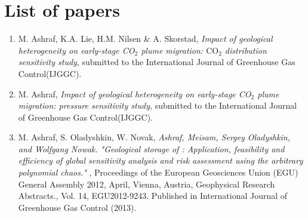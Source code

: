 \chapter{List of papers}

\begin{enumerate}

\item {M. Ashraf, K.A. Lie, H.M. Nilsen \& A. Skorstad}, \textit{Impact of
geological heterogeneity on early-stage {CO}$_2$ plume migration: $\mbox{CO}_2$
distribution sensitivity study}, submitted to the International Journal of
Greenhouse Gas Control(IJGGC). 

\item {M. Ashraf}, \textit{Impact of geological heterogeneity on early-stage
{CO}$_2$ plume migration: pressure sensitivity study}, submitted to the
International Journal of Greenhouse Gas Control(IJGGC).  

\item {M. Ashraf, S. Oladyshkin, W. Novak}, \textit{Ashraf, Meisam, Sergey Oladyshkin, and Wolfgang Nowak. "Geological storage of \coo: Application, feasibility and efficiency of global sensitivity analysis and risk assessment using the arbitrary polynomial chaos." }, Proceedings of the European
Geosciences Union (EGU) General Assembly 2012, April, Vienna, Austria,
Geophysical Research Abstracts., Vol. 14, EGU2012-9243. Published in International Journal of Greenhouse Gas Control (2013).

\end{enumerate}
